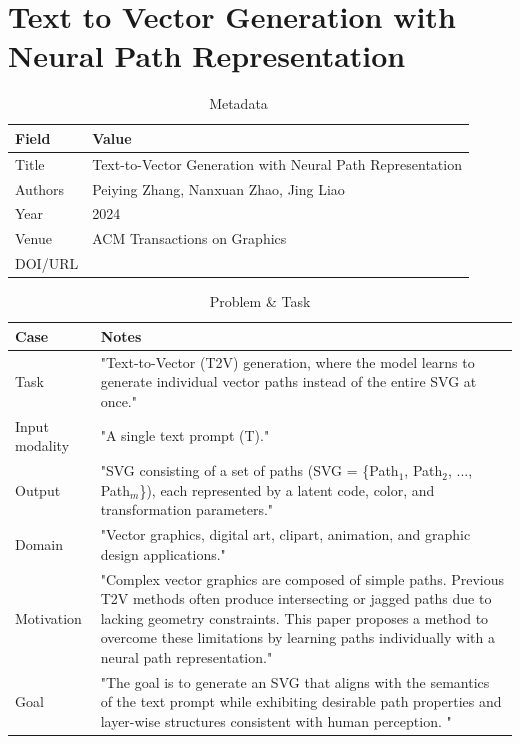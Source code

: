 \newpage
\chapter{Text to Vector Generation with Neural Path Representation}

\begin{table}[h!]
\centering
\caption{Metadata}
\begin{tabular}{|l|l|}
\hline
\textbf{Field} & \textbf{Value} \\ \hline
Title & Text-to-Vector Generation with Neural Path Representation \\ \hline
Authors & Peiying Zhang, Nanxuan Zhao, Jing Liao \\ \hline
Year & 2024 \\ \hline
Venue & ACM Transactions on Graphics \\ \hline
DOI/URL & \href10.48550/arXiv.2405.10317 \\ \hline
\end{tabular}
\end{table}

\begin{table}[h!]
\centering
\caption{Problem \& Task}
\begin{tabular}{|l|p{10cm}|}
\hline
\textbf{Case} & \textbf{Notes} \\ \hline
Task & "Text-to-Vector (T2V) generation, where the model learns to generate individual vector paths instead of the entire SVG at once." \\ \hline
Input modality & "A single text prompt (T)." \\ \hline
Output & "SVG consisting of a set of paths (SVG = \{Path$_1$, Path$_2$, ..., Path$_m$\}), each represented by a latent code, color, and transformation parameters." \\ \hline
Domain & "Vector graphics, digital art, clipart, animation, and graphic design applications." \\ \hline
Motivation & "Complex vector graphics are composed of simple paths. Previous T2V methods often produce intersecting or jagged paths due to lacking geometry constraints. This paper proposes a method to overcome these limitations by learning paths individually with a neural path representation." \\ \hline
Goal & "The goal is to generate an SVG that aligns with the semantics of the text prompt while exhibiting desirable path properties and layer-wise structures consistent with human perception. " \\ \hline
\end{tabular}
\end{table}


